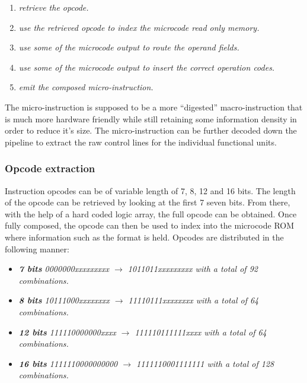 \documentclass{article}
\begin{document}
            \begin{enumerate}

                \item \textit{retrieve the opcode.}
                \item \textit{use the retrieved opcode to index the microcode read only memory.}
                \item \textit{use some of the microcode output to route the operand fields.}
                \item \textit{use some of the microcode output to insert the correct operation codes.}
                \item \textit{emit the composed micro-instruction.}

            \end{enumerate}

            The micro-instruction is supposed to be a more ``digested'' macro-instruction that is much more hardware friendly while still retaining some information density in order to reduce it's size. The micro-instruction can be further decoded down the pipeline to extract the raw control lines for the individual functional units.

            \subsubsection{Opcode extraction}

                \vspace{10pt}

                Instruction opcodes can be of variable length of 7, 8, 12 and 16 bits. The length of the opcode can be retrieved by looking at the first 7 seven bits. From there, with the help of a hard coded logic array, the full opcode can be obtained. Once fully composed, the opcode can then be used to index into the microcode ROM where information such as the format is held. Opcodes are distributed in the following manner:

                \begin{itemize}

                    \item \textit{\textbf{7 bits} 0000000xxxxxxxxx $\rightarrow$ 1011011xxxxxxxxx with a total of 92 combinations.}
                    \item \textit{\textbf{8 bits} 10111000xxxxxxxx $\rightarrow$ 11110111xxxxxxxx with a total of 64 combinations.}
                    \item \textit{\textbf{12 bits} 111110000000xxxx $\rightarrow$ 111110111111xxxx with a total of 64 combinations.}
                    \item \textit{\textbf{16 bits} 1111110000000000 $\rightarrow$ 1111110001111111 with a total of 128 combinations.}

                \end{itemize}
\end{document}
